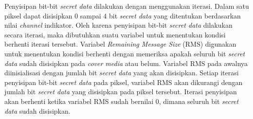 \documentclass[a4paper,twoside]{article}
\begin{document}
\begin{enumerate}
\begin{itemize}
		Penyisipan bit-bit \textit{secret data} dilakukan dengan menggunakan iterasi. Dalam satu piksel dapat disisipkan 0 sampai 4 bit \textit{secret data} yang ditentukan berdasarkan nilai \textit{channel} indikator. Oleh karena penyisipan bit-bit \textit{secret data} dilakukan secara iterasi, maka dibutuhkan suatu variabel untuk menentukan kondisi berhenti iterasi tersebut. Variabel \textit{Remaining Message Size} (RMS) digunakan untuk menentukan kondisi berhenti dengan memeriksa apakah seluruh bit \textit{secret data} sudah disisipkan pada \textit{cover media} atau belum. Variabel RMS pada awalnya diinisialisasi dengan jumlah bit \textit{secret data} yang akan disisipkan. Setiap iterasi penyisipan bit-bit \textit{secret data} pada piksel, variabel RMS akan dikurangi dengan jumlah bit \textit{secret data} yang disisipkan pada piksel tersebut. Iterasi penyisipan akan berhenti ketika variabel RMS sudah bernilai 0, dimana seluruh bit \textit{secret data} sudah disisipkan.\\	
		

\end{itemize}
\end{enumerate}
\end{document}
